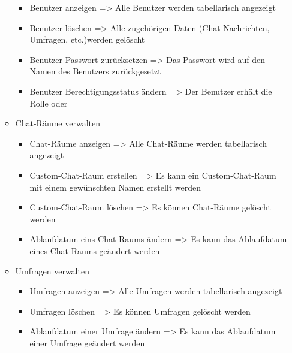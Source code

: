 \begin{itemize}
\begin{itemize}
\begin{itemize}
        \item Benutzer anzeigen
        \newline
        => Alle Benutzer werden tabellarisch angezeigt
        \item Benutzer löschen
        \newline
        => Alle zugehörigen Daten (Chat Nachrichten, Umfragen, etc.)werden gelöscht
        \item Benutzer Passwort zurücksetzen
        \newline
        => Das Passwort wird auf den Namen des Benutzers zurückgesetzt
        \item Benutzer Berechtigungsstatus ändern
        \newline
        => Der Benutzer erhält die Rolle  oder 
      \end{itemize}
    \item Chat-Räume verwalten
      \begin{itemize}
        \item Chat-Räume anzeigen
        \newline
        => Alle Chat-Räume werden tabellarisch angezeigt
        \item Custom-Chat-Raum erstellen
        \newline
        => Es kann ein Custom-Chat-Raum mit einem gewünschten Namen erstellt werden
        \item Custom-Chat-Raum löschen
        \newline
        => Es können Chat-Räume gelöscht werden
        \item Ablaufdatum eins Chat-Raums ändern
        \newline
        => Es kann das Ablaufdatum eines Chat-Raums geändert werden
      \end{itemize}
    \item Umfragen verwalten
      \begin{itemize}
        \item Umfragen anzeigen
        \newline
        => Alle Umfragen werden tabellarisch angezeigt
        \item Umfragen löschen
        \newline
        => Es können Umfragen gelöscht werden
        \item Ablaufdatum einer Umfrage ändern
        \newline
        => Es kann das Ablaufdatum einer Umfrage geändert werden
      \end{itemize}

\end{itemize}
\end{itemize}
